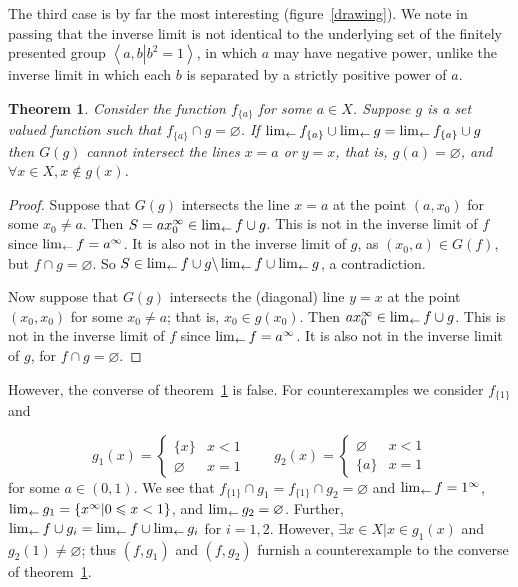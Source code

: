 \documentclass{article}
\newtheorem{thm}{Theorem}
\theoremstyle{definition}
\let\emptyset\varnothing
\begin{document}
The third case is by far the most interesting (figure~\ref{drawing}).
We note in passing that the inverse limit is not identical to the
underlying set of the finitely presented group $\left\langle
a,b\left|b^2=1\right.\right\rangle$, in which $a$ may have negative
power, unlike the inverse limit in which each $b$ is separated by a
strictly positive power of $a$.

\newcommand{\fa}{f_{\lbrace a\rbrace}}

\begin{thm}\label{fish}
Consider the function $\fa$ for some $a\in X$.  Suppose $g$ is a set
valued function such that $\fa\cap g=\emptyset$.  If
$\invlim{\fa}\cup\invlim{g} = \invlim{\fa\cup g}$ then $G(g)$ cannot
intersect the lines $x = a$ or $y = x$, that is, $g(a)=\emptyset$, and
$\forall x\in X, x\notin g(x)$.
\end{thm}

\begin{proof}
Suppose that $G(g)$ intersects the line $x = a$ at the point $(a,x_0)$
for some $x_0\neq a$.  Then $S=ax_0^\infty\in\lim_{\leftarrow} f\cup g$.  This
is not in the inverse limit of $f$ since $\lim_{\leftarrow} f = a^\infty$.  It
is also not in the inverse limit of $g$, as $(x_0,a) \in G(f)$, but
$f\cap g=\emptyset$.  So $S\in\lim_{\leftarrow} f\cup
  g\backslash\lim_{\leftarrow} f\cup\lim_{\leftarrow} g$, a contradiction.

Now suppose that $G(g)$ intersects the (diagonal) line $y = x$ at the
point $(x_0,x_0)$ for some $x_0\neq a$; that is, $x_0\in g(x_0)$.
Then $ax_0^\infty\in \lim_{\leftarrow} f\cup g$.  This is not in the inverse
limit of $f$ since $\lim_{\leftarrow} f = a^\infty$.  It is also not in the
inverse limit of $g$, for $f\cap g=\emptyset$.  
\end{proof}


However, the converse of theorem~\ref{fish} is false.  For
counterexamples we consider $f_{\lbrace 1\rbrace}$ and

\begin{equation}
  g_1(x) = \begin{cases}
    \lbrace x\rbrace & x<1\\
    \emptyset & x=1
  \end{cases}
\qquad
  g_2(x) = \begin{cases}
    \emptyset & x<1\\
    \lbrace a\rbrace & x=1
  \end{cases}
\end{equation}
for some $a\in(0,1)$.  We see that $
f_{\lbrace 1\rbrace}\cap g_{1}=
f_{\lbrace 1\rbrace}\cap g_{2}
=\emptyset$
and $\lim_{\leftarrow} f=1^\infty$,
$\lim_{\leftarrow} g_1=\lbrace x^\infty | 0\leqslant x< 1\rbrace$, and
$\invlim{g_2}=\emptyset$.  Further, $\lim_{\leftarrow} f\cup
  g_i=\lim_{\leftarrow} f\cup\lim_{\leftarrow} g_i$ for $i=1,2$.  However, $\exists
x\in X|x\in g_1(x)$ and $g_2(1)\neq\emptyset$; thus $(f,g_1)$ and
$(f,g_2)$ furnish a counterexample to the converse of
theorem~\ref{fish}.
\end{document}

